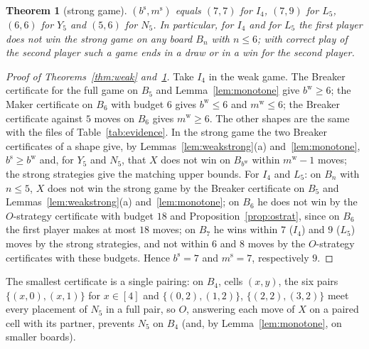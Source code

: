 \documentclass[11pt]{article}
\newtheorem{theorem}{Theorem}
\theoremstyle{definition}
\theoremstyle{remark}
\newcommand{\bweak}{b^{\mathrm w}}
\newcommand{\mweak}{m^{\mathrm w}}
\newcommand{\bstr}{b^{\mathrm s}}
\newcommand{\mstr}{m^{\mathrm s}}
\begin{document}
\begin{theorem}[strong game]\label{thm:strong}
$(\bstr,\mstr)$ equals $(7,7)$ for $I_4$, $(7,9)$ for $L_5$, $(6,6)$ for $Y_5$ and $(5,6)$ for $N_5$.
In particular, for $I_4$ and for $L_5$ the first player does not win the strong game on any board
$B_n$ with $n\le 6$; with correct play of the second player such a game ends in a draw or in a win
for the second player.
\end{theorem}

\begin{proof}[Proof of Theorems~\ref{thm:weak} and~\ref{thm:strong}]
Take $I_4$ in the weak game. The Breaker certificate for the full game on $B_5$ and
Lemma~\ref{lem:monotone} give $\bweak\ge 6$; the Maker certificate on $B_6$ with budget $6$ gives
$\bweak\le 6$ and $\mweak\le 6$; the Breaker certificate against $5$ moves on $B_6$ gives $\mweak\ge 6$. The
other shapes are the same with the files of Table~\ref{tab:evidence}. In the strong game the two
Breaker certificates of a shape give, by Lemmas~\ref{lem:weakstrong}(a) and~\ref{lem:monotone}, $\bstr\ge\bweak$ and, for $Y_5$
and $N_5$, that $X$ does not win on $B_{\bweak}$ within $\mweak-1$ moves; the strong strategies give the
matching upper bounds. For $I_4$ and $L_5$: on $B_n$ with $n\le 5$, $X$ does not win the strong game
by the Breaker certificate on $B_5$ and Lemmas~\ref{lem:weakstrong}(a) and~\ref{lem:monotone}; on
$B_6$ he does not win by the $O$-strategy certificate with budget $18$ and
Proposition~\ref{prop:ostrat}, since on $B_6$ the first player makes at most $18$ moves; on $B_7$ he
wins within $7$ ($I_4$) and $9$ ($L_5$) moves by the strong strategies, and not within $6$ and $8$
moves by the $O$-strategy certificates with these budgets. Hence $\bstr=7$ and $\mstr=7$,
respectively $9$.
\end{proof}

The smallest certificate is a single pairing: on $B_4$, cells $(x,y)$, the six pairs
$\{(x,0),(x,1)\}$ for $x\in[4]$ and $\{(0,2),(1,2)\}$, $\{(2,2),(3,2)\}$ meet every placement of $N_5$
in a full pair, so $O$, answering each move of $X$ on a paired cell with its partner, prevents $N_5$
on $B_4$ (and, by Lemma~\ref{lem:monotone}, on smaller boards).
\end{document}
